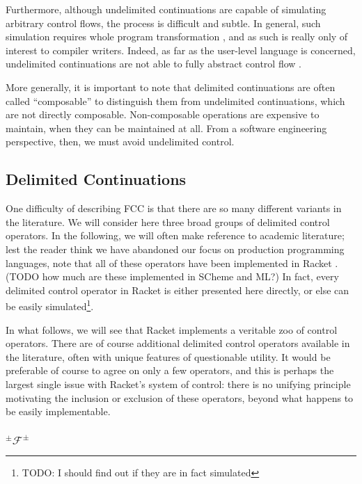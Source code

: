 \documentclass[11pt]{article}
\newcommand{\maybePage}{\newpage}
\newcommand\F{\mathcal{F}}
\newcommand\pmFpm{^\pm\F^\pm}
\begin{document}
Furthermore, although undelimited continuations are capable of simulating arbitrary control flows, the process is difficult and subtle.
In general, such simulation requires whole program transformation \cite{Filinski94}, and as such is really only of interest to compiler writers.
Indeed, as far as the user-level language is concerned, undelimited continuations are not able to fully abstract control flow \cite{Sitaram90}.

More generally, it is important to note that delimited continuations are often called ``composable'' to distinguish them from undelimited continuations, which are not directly composable.
Non-composable operations are expensive to maintain, when they can be maintained at all.
From a software engineering perspective, then, we must avoid undelimited control.


\maybePage
\subsection{Delimited Continuations}
\label{delimControl}

One difficulty of describing FCC is that there are so many different variants in the literature.
We will consider here three broad groups of delimited control operators.
In the following, we will often make reference to academic literature;
lest the reader think we have abandoned our focus on production programming languages, note that all of these operators have been implemented in Racket \cite{RacketReference}. 
(TODO how much are these implemented in SCheme and ML?)
In fact, every delimited control operator in Racket is either presented here directly, or else can be easily simulated\footnote{TODO: I should find out if they are in fact simulated}.

In what follows, we will see that Racket implements a veritable zoo of control operators.
There are of course additional delimited control operators available in the literature, often with unique features of questionable utility.
It would be preferable of course to agree on only a few operators, and this is perhaps the largest single issue with Racket's system of control: there is no unifying principle motivating the inclusion or exclusion of these operators, beyond what happens to be easily implementable.

\maybePage
\subsubsection{$\pmFpm$}
\end{document}
